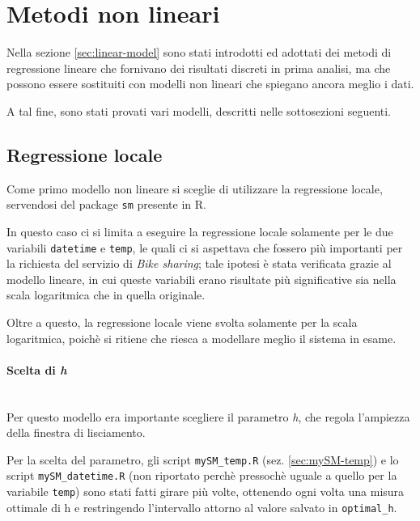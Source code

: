 \section{Metodi non lineari}\label{sec:non-linear}

Nella sezione \ref{sec:linear-model} sono stati introdotti ed adottati dei
metodi di regressione lineare che fornivano dei risultati discreti in prima
analisi, ma che possono essere sostituiti con modelli non lineari che spiegano
ancora meglio i dati.

A tal fine, sono stati provati vari modelli, descritti nelle sottosezioni
seguenti.


\subsection{Regressione locale}\label{sec:local-regression}
Come primo modello non lineare si sceglie di utilizzare la regressione locale,
servendosi del package \texttt{sm} presente in R.

In questo caso ci si limita a eseguire la regressione locale solamente per le
due variabili \texttt{datetime} e \texttt{temp}, le quali ci si aspettava che
fossero più importanti per la richiesta del servizio di \emph{Bike sharing};
tale ipotesi è stata verificata grazie al modello lineare, in cui queste
variabili erano risultate più significative sia nella scala logaritmica che in
quella originale.

Oltre a questo, la regressione locale viene svolta solamente per la scala
logaritmica, poichè si ritiene che riesca a modellare meglio il sistema in
esame.

\paragraph{Scelta di \emph{h}} \mbox{}\\
Per questo modello era importante scegliere il parametro \emph{h}, che regola
l'ampiezza della finestra di lisciamento.

Per la scelta del parametro, gli script \texttt{mySM\_temp.R} (sez.
\ref{sec:mySM-temp}) e lo script \texttt{mySM\_datetime.R} (non riportato
perchè pressochè uguale a quello per la variabile \texttt{temp}) sono stati
fatti girare più volte, ottenendo ogni volta una misura ottimale di h e
restringendo l'intervallo attorno al valore salvato in \texttt{optimal\_h}.


